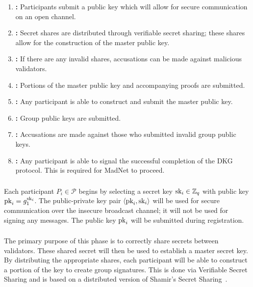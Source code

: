 \begin{enumerate}
\item \textbf{\Registration{}:}
    Participants submit a public key
    which will allow for secure communication on an open channel.
\item \textbf{\ShareDistribution{}:}
    Secret shares are distributed
    through verifiable secret sharing;
    these shares allow for the construction of the master public key.
\item \textbf{\ShareDistributionDispute{}:}
    If there are any invalid shares,
    accusations can be made against malicious validators.
\item \textbf{\KeyShare{}:}
    Portions of the master public key and accompanying
    proofs are submitted.
\item \textbf{\MasterPublicKey{}:}
    Any participant is able to construct and submit
    the master public key.
\item \textbf{\GPKSubmission{}:}
    Group public keys are submitted.
\item \textbf{\GPKDispute{}:}
    Accusations are made against those who submitted invalid
    group public keys.
\item \textbf{\Completion{}:}
    Any participant is able to signal the successful completion
    of the DKG protocol.
    This is required for MadNet to proceed.
\end{enumerate}



\subsubsection{\Registration{}}
Each participant $P_{i}\in\mathcal{P}$ begins by selecting
a secret key $\textrm{sk}_{i}\in\mathbb{Z}_{q}$ with public key $\textrm{pk}_{i} = g_{1}^{\textrm{sk}_{i}}$.
The public-private key pair $\left\langle \textrm{pk}_{i},\textrm{sk}_{i} \right\rangle$ will be
used for secure communication over the insecure broadcast channel;
it will not be used for signing any messages.
The public key $\textrm{pk}_{i}$ will be submitted during registration.



\subsubsection{\ShareDistribution{}}
\label{sssec:share_distribution}
The primary purpose of this phase is to correctly share secrets
between validators.
These shared secret will then be used to establish a master secret key.
By distributing the appropriate shares,
each participant will be able to construct a portion
of the key to create group signatures.
This is done via Verifiable Secret Sharing
and is based on a distributed version of
Shamir's Secret Sharing~\cite{shamir1979share}.

